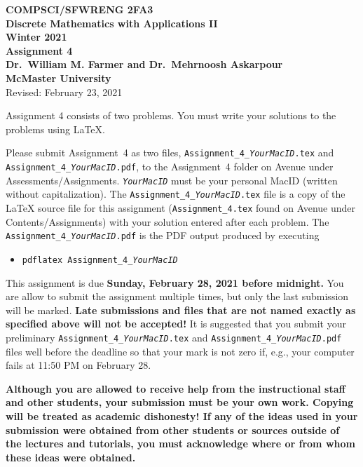 \documentclass[11pt,fleqn]{article}
\begin{document}
\begin{center}

{\large \textbf{COMPSCI/SFWRENG 2FA3}}\\[2mm]
{\large \textbf{Discrete Mathematics with Applications II}}\\[2mm]
{\large \textbf{Winter 2021}}\\[8mm]
{\huge \textbf{Assignment 4}}\\[6mm]
{\large \textbf{Dr.~William M. Farmer and Dr.~Mehrnoosh Askarpour}}\\[2mm]
{\large \textbf{McMaster University}}\\[6mm]
{\large Revised: February 23, 2021}

\end{center}

\medskip

Assignment 4 consists of two problems.  You must write your solutions
to the problems using LaTeX.

Please submit Assignment~4 as two files,
\texttt{Assignment\_4\_\emph{YourMacID}.tex} and
\texttt{Assignment\_4\_\emph{YourMacID}.pdf}, to the Assignment~4
folder on Avenue under Assessments/Assignments.
\texttt{\emph{YourMacID}} must be your personal MacID (written without
capitalization).  The \texttt{Assignment\_4\_\emph{YourMacID}.tex}
file is a copy of the LaTeX source file for this assignment
(\texttt{Assignment\_4.tex} found on Avenue under
Contents/Assignments) with your solution entered after each problem.
The \texttt{Assignment\_4\_\emph{YourMacID}.pdf} is the PDF output
produced by executing

\begin{itemize}

  \item[] \texttt{pdflatex Assignment\_4\_\emph{YourMacID}}

\end{itemize}

This assignment is due \textbf{Sunday, February 28, 2021 before
  midnight.}  You are allow to submit the assignment multiple times,
but only the last submission will be marked.  \textbf{Late submissions
  and files that are not named exactly as specified above will not be
  accepted!}  It is suggested that you submit your preliminary
\texttt{Assignment\_4\_\emph{YourMacID}.tex} and
\texttt{Assignment\_4\_\emph{YourMacID}.pdf} files well before the
deadline so that your mark is not zero if, e.g., your computer fails
at 11:50 PM on February 28.

\textbf{Although you are allowed to receive help from the
  instructional staff and other students, your submission must be your
  own work.  Copying will be treated as academic dishonesty! If any of
  the ideas used in your submission were obtained from other students
  or sources outside of the lectures and tutorials, you must
  acknowledge where or from whom these ideas were obtained.}
\end{document}
